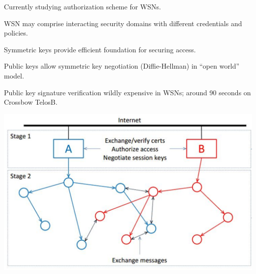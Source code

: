 
Currently studying authorization scheme for WSNs.
\begin{citemize}
\item WSN may comprise interacting security domains with different credentials
and policies.
\item Symmetric keys provide efficient foundation for securing access.
\item Public keys allow symmetric key negotiation (Diffie-Hellman) in ``open world''
model.
\end{citemize}
Public key signature verification wildly expensive in WSNs; around 90 seconds
on Crossbow TelosB.

\stopslide


%


\hspace*{.6in}\includegraphics{spartanrpc}

